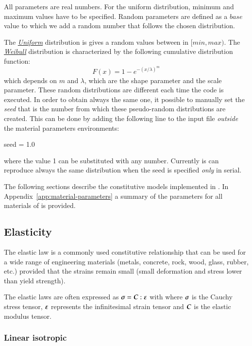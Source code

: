 All parameters are real numbers. For the uniform distribution, minimum
and maximum values have to be specified.
Random parameters are defined as a $base$ value to which we add a random number
that follows the chosen distribution.

The
\href{http://en.wikipedia.org/wiki/Uniform\_distribution\_(continuous)}{\emph{Uniform}}
distribution is gives a random values between in $[min, max)$. The
\href{http://en.wikipedia.org/wiki/Weibull\_distribution}{\emph{Weibull}}
distribution is characterized by the following cumulative distribution
function:
\begin{equation}
  F(x) = 1- e^{-\left({x/\lambda}\right)^m}
\end{equation}
which depends on  $m$ and $\lambda$, which are the shape parameter and the scale
parameter. These random distributions are different each time the code
is executed. In order to obtain always the same one, it possible to
manually set the \emph{seed} that is the number from which these
pseudo-random distributions are created. This can be done by adding
the following line to the input file \emph{outside} the material
parameters environments:
\begin{cpp}
  seed = 1.0
\end{cpp}
where the value 1 can be substituted with any number. Currently
\akantu is can reproduce always the same distribution when the seed is
specified \emph{only} in serial.

The following sections describe the constitutive models implemented in
\akantu. In Appendix~\ref{app:material-parameters} a summary of the
parameters for all materials of \akantu is provided.


\subsection{Elasticity}

The elastic law is a commonly used constitutive relationship that can be used
for a wide range of engineering materials (\eg metals, concrete, rock, wood,
glass, rubber, etc.) provided that the strains remain small (\ie small
deformation and stress lower than yield strength).

The elastic laws are often expressed as $\boldsymbol{\sigma} =
\boldsymbol{C}:\boldsymbol{\varepsilon}$ with where $\boldsymbol{\sigma}$ is the Cauchy stress tensor,
$\boldsymbol{\varepsilon}$ represents the infinitesimal strain tensor and $\boldsymbol{C}$ is the
elastic modulus tensor.

\subsubsection{Linear isotropic}

